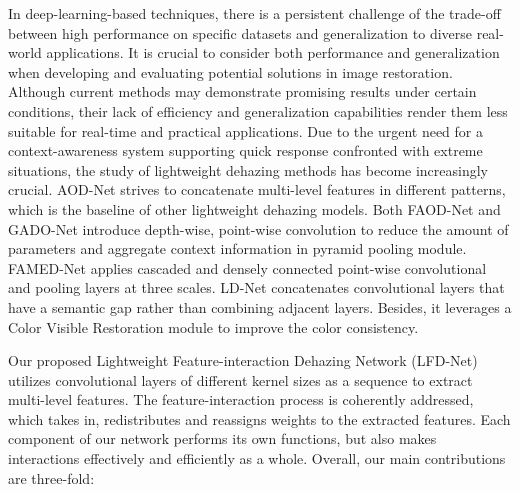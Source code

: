 \documentclass[lettersize,journal]{IEEEtran}
\begin{document}
In deep-learning-based techniques, there is a persistent challenge of the trade-off between high performance on specific datasets and generalization to diverse real-world applications. It is crucial to consider both performance and generalization when developing and evaluating potential solutions in image restoration. Although current methods may demonstrate promising results under certain conditions, their lack of efficiency and generalization capabilities render them less suitable for real-time and practical applications. Due to the urgent need for a context-awareness system supporting quick response confronted with extreme situations, the study of lightweight dehazing methods has become increasingly crucial. AOD-Net\cite{li2017aod} strives to concatenate multi-level features in different patterns, which is the baseline of other lightweight dehazing models. Both FAOD-Net\cite{2020FAOD} and GADO-Net\cite{GAOD} introduce depth-wise, point-wise convolution to reduce the amount of parameters and aggregate context information in pyramid pooling module. FAMED-Net\cite{2020FAMED} applies cascaded and densely connected point-wise convolutional and pooling layers at three scales. LD-Net\cite{ullah2021light} concatenates convolutional layers that have a semantic gap rather than combining adjacent layers. Besides, it leverages a Color Visible Restoration module to improve the color consistency. 


Our proposed Lightweight Feature-interaction Dehazing Network (LFD-Net) utilizes convolutional layers of different kernel sizes as a sequence to extract multi-level features. The feature-interaction process is coherently addressed, which takes in, redistributes and reassigns weights to the extracted features. Each component of our network performs its own functions, but also makes interactions effectively and efficiently as a whole. Overall, our main contributions are three-fold:
\end{document}
